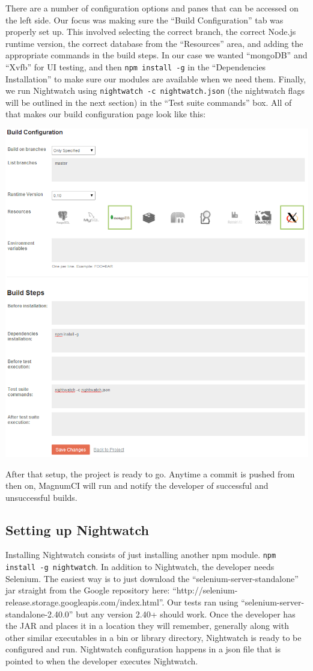 \documentclass[12pt]{ucthesis}
\newenvironment{Figure}
  {\par\medskip\noindent\minipage{\linewidth}}
  {\endminipage\par\medskip}
\begin{document}
There are a number of configuration options and panes that can be accessed on the left side. Our focus was making sure the ``Build Configuration'' tab was properly set up. This involved selecting the correct branch, the correct Node.js runtime version, the correct database from the ``Resources'' area, and adding the appropriate commands in the build steps. In our case we wanted ``mongoDB'' and ``Xvfb'' for UI testing, and then \lstinline{npm install -g} in the ``Dependencies Installation'' to make sure our modules are available when we need them. Finally, we run Nightwatch using \lstinline{nightwatch -c nightwatch.json} (the nightwatch flags will be outlined in the next section) in the ``Test suite commands'' box. All of that makes our build configuration page look like this:
\begin{Figure}
  \centering
  \includegraphics[width=0.75\linewidth]{magnumCI_customize_build_filled.png}
\end{Figure}

After that setup, the project is ready to go. Anytime a commit is pushed from then on, MagnumCI will run and notify the developer of successful and unsuccessful builds.

\subsection{Setting up Nightwatch}
Installing Nightwatch consists of just installing another npm module. \lstinline{npm install -g nightwatch}. In addition to Nightwatch, the developer needs Selenium. The easiest way is to just download the ``selenium-server-standalone'' jar straight from the Google repository here: ``http://selenium-release.storage.googleapis.com/index.html''. Our tests ran using ``selenium-server-standalone-2.40.0'' but any version 2.40+ should work. Once the developer has the JAR and places it in a location they will remember, generally along with other similar executables in a bin or library directory, Nightwatch is ready to be configured and run. Nightwatch configuration happens in a json file that is pointed to when the developer executes Nightwatch. 
\end{document}
